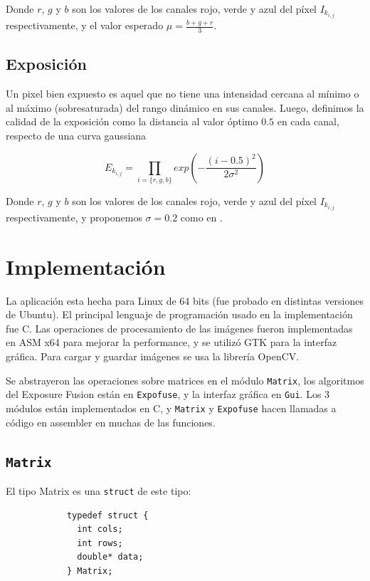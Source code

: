 \documentclass[a4paper,10pt]{article}
\begin{document}
            Donde $r$, $g$ y $b$ son los valores de los canales rojo, verde y azul del píxel $I_{k_{i,j}}$ respectivamente, y el valor esperado $\mu = \frac{b+g+r}{3}$.

        \subsection{Exposición}

            Un pixel bien expuesto es aquel que no tiene una intensidad cercana al mínimo o al máximo (sobresaturada) del rango dinámico en sus canales. Luego, definimos la calidad de la exposición como la distancia al valor óptimo $0.5$ en cada canal, respecto de una curva gaussiana
            
            $$ E_{k_{i,j}} = \prod_{i=\{r,g,b\}}{exp(-\frac{(i-0.5)^2}{2\sigma^2})}$$
            
            Donde $r$, $g$ y $b$ son los valores de los canales rojo, verde y azul del píxel $I_{k_{i,j}}$ respectivamente, y proponemos $\sigma = 0.2$ como en \cite{DBLP:conf/pg/MertensKR07}.

    \section{Implementación}

        La aplicación esta hecha para Linux de 64 bits (fue probado en distintas versiones de Ubuntu). El principal lenguaje de programación usado en la implementación fue C. Las operaciones de procesamiento de las imágenes fueron implementadas en ASM x64 para mejorar la performance, y se utilizó GTK para la interfaz gráfica. Para cargar y guardar imágenes se usa la librería OpenCV.
        
        Se abstrayeron las operaciones sobre matrices en el módulo \texttt{Matrix}, los algoritmos del Exposure Fusion están en \texttt{Expofuse}, y la interfaz gráfica en \texttt{Gui}. Los 3 módulos están implementados en C, y \texttt{Matrix} y \texttt{Expofuse} hacen llamadas a código en assembler en muchas de las funciones.
        
        \subsection{\texttt{Matrix}}
            El tipo Matrix es una \texttt{struct} de este tipo:
            
            \begin{verbatim}
            typedef struct {
              int cols;
              int rows;
              double* data;
            } Matrix;\end{verbatim}
\end{document}
